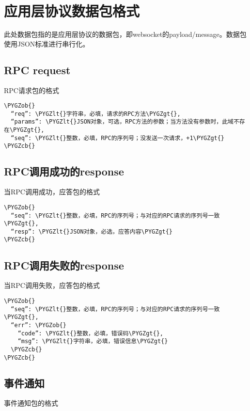 \documentclass[letterpaper,10pt,english]{sphinxmanual}
\def\PYGZob{\char`\{}
\def\PYGZcb{\char`\}}
\def\PYGZlt{\char`\<}
\def\PYGZgt{\char`\>}
\begin{document}
\section{应用层协议数据包格式}
\label{rpc:id3}
此处数据包指的是应用层协议的数据包，即websocket的payload/message。数据包使用JSON标准进行串行化。


\subsection{RPC request}
\label{rpc:rpc-request}
RPC请求包的格式

\begin{Verbatim}[commandchars=\\\{\}]
\PYGZob{}
  “req”: \PYGZlt{}字符串，必填，请求的RPC方法\PYGZgt{},
  “params”: \PYGZlt{}JSON对象，可选，RPC方法的参数；当方法没有参数时，此域不存在\PYGZgt{},
  “seq”: \PYGZlt{}整数，必填，RPC的序列号；没发送一次请求，+1\PYGZgt{}
\PYGZcb{}
\end{Verbatim}


\subsection{RPC调用成功的response}
\label{rpc:rpcresponse}
当RPC调用成功，应答包的格式

\begin{Verbatim}[commandchars=\\\{\}]
\PYGZob{}
  “seq”: \PYGZlt{}整数，必填，RPC的序列号；与对应的RPC请求的序列号一致\PYGZgt{},
  “resp”: \PYGZlt{}JSON对象，必选，应答内容\PYGZgt{}
\PYGZcb{}
\end{Verbatim}


\subsection{RPC调用失败的response}
\label{rpc:id4}
当RPC调用失败，应答包的格式

\begin{Verbatim}[commandchars=\\\{\}]
\PYGZob{}
  “seq”: \PYGZlt{}整数，必填，RPC的序列号；与对应的RPC请求的序列号一致\PYGZgt{},
  “err”: \PYGZob{}
    “code”: \PYGZlt{}整数，必填，错误码\PYGZgt{},
    “msg”: \PYGZlt{}字符串，必填，错误信息\PYGZgt{}
  \PYGZcb{}
\PYGZcb{}
\end{Verbatim}


\subsection{事件通知}
\label{rpc:id5}
事件通知包的格式
\end{document}
